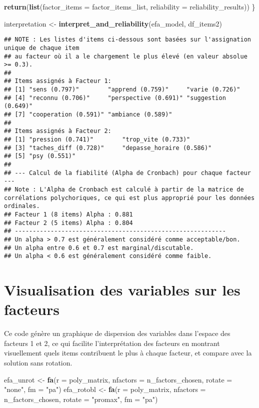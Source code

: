 \documentclass[
]{article}
\newenvironment{Shaded}{\begin{snugshade}}{\end{snugshade}}
\newcommand{\AttributeTok}[1]{\textcolor[rgb]{0.13,0.29,0.53}{#1}}
\newcommand{\FunctionTok}[1]{\textcolor[rgb]{0.13,0.29,0.53}{\textbf{#1}}}
\newcommand{\NormalTok}[1]{#1}
\newcommand{\OtherTok}[1]{\textcolor[rgb]{0.56,0.35,0.01}{#1}}
\newcommand{\StringTok}[1]{\textcolor[rgb]{0.31,0.60,0.02}{#1}}
\begin{document}
\begin{Shaded}
\begin{Highlighting}[]
  \FunctionTok{return}\NormalTok{(}\FunctionTok{list}\NormalTok{(}\AttributeTok{factor\_items =}\NormalTok{ factor\_items\_list, }\AttributeTok{reliability =}\NormalTok{ reliability\_results))}
\NormalTok{\}}

\NormalTok{interpretation }\OtherTok{\textless{}{-}} \FunctionTok{interpret\_and\_reliability}\NormalTok{(efa\_model, df\_items2)}
\end{Highlighting}
\end{Shaded}

\begin{verbatim}
## NOTE : Les listes d'items ci-dessous sont basées sur l'assignation unique de chaque item
## au facteur où il a le chargement le plus élevé (en valeur absolue >= 0.3).
## 
## Items assignés à Facteur 1:
## [1] "sens (0.797)"        "apprend (0.759)"     "varie (0.726)"      
## [4] "reconnu (0.706)"     "perspective (0.691)" "suggestion (0.649)" 
## [7] "cooperation (0.591)" "ambiance (0.589)"   
## 
## Items assignés à Facteur 2:
## [1] "pression (0.741)"        "trop_vite (0.733)"      
## [3] "taches_diff (0.728)"     "depasse_horaire (0.586)"
## [5] "psy (0.551)"            
## 
## --- Calcul de la fiabilité (Alpha de Cronbach) pour chaque facteur ---
## Note : L'Alpha de Cronbach est calculé à partir de la matrice de corrélations polychoriques, ce qui est plus approprié pour les données ordinales.
## Facteur 1 (8 items) Alpha : 0.881
## Facteur 2 (5 items) Alpha : 0.804
## -----------------------------------------------------------
## Un alpha > 0.7 est généralement considéré comme acceptable/bon.
## Un alpha entre 0.6 et 0.7 est marginal/discutable.
## Un alpha < 0.6 est généralement considéré comme faible.
\end{verbatim}

\section{Visualisation des variables sur les
facteurs}\label{visualisation-des-variables-sur-les-facteurs}

Ce code génère un graphique de dispersion des variables dans l'espace
des facteurs 1 et 2, ce qui facilite l'interprétation des facteurs en
montrant visuellement quels items contribuent le plus à chaque facteur,
et compare avec la solution sans rotation.

\begin{Shaded}
\begin{Highlighting}[]
\NormalTok{efa\_unrot }\OtherTok{\textless{}{-}} \FunctionTok{fa}\NormalTok{(}\AttributeTok{r =}\NormalTok{ poly\_matrix, }\AttributeTok{nfactors =}\NormalTok{ n\_factors\_chosen, }\AttributeTok{rotate =} \StringTok{"none"}\NormalTok{, }\AttributeTok{fm =} \StringTok{"pa"}\NormalTok{)}
\NormalTok{efa\_rotobl }\OtherTok{\textless{}{-}} \FunctionTok{fa}\NormalTok{(}\AttributeTok{r =}\NormalTok{ poly\_matrix, }\AttributeTok{nfactors =}\NormalTok{ n\_factors\_chosen, }\AttributeTok{rotate =} \StringTok{"promax"}\NormalTok{, }\AttributeTok{fm =} \StringTok{"pa"}\NormalTok{)}
\end{Highlighting}
\end{Shaded}
\end{document}
